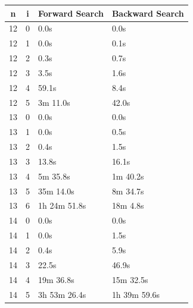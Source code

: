\documentclass[10pt,journal,compsoc]{IEEEtran}
\begin{document}
\begin{table}[htbp]
  \begin{tabular}{c|c|l|l}
    \textbf{n} & \textbf{i} & \textbf{Forward Search } & \textbf{Backward Search } \\ \hline
    12         & 0          & 0.0s                     & 0.0s                      \\
    12         & 1          & 0.0s                     & 0.1s                      \\
    12         & 2          & 0.3s                     & 0.7s                      \\
    12         & 3          & 3.5s                     & 1.6s                      \\
    12         & 4          & 59.1s                    & 8.4s                      \\
    12         & 5          & 3m 11.0s                 & 42.0s                     \\
    \hline
    13         & 0          & 0.0s                     & 0.0s                      \\
    13         & 1          & 0.0s                     & 0.5s                      \\
    13         & 2          & 0.4s                     & 1.5s                      \\
    13         & 3          & 13.8s                    & 16.1s                     \\
    13         & 4          & 5m 35.8s                 & 1m 40.2s                  \\
    13         & 5          & 35m 14.0s                & 8m 34.7s                  \\
    13         & 6          & 1h 24m 51.8s             & 18m 4.8s                  \\
    \hline
    14         & 0          & 0.0s                     & 0.0s                      \\
    14         & 1          & 0.0s                     & 1.5s                      \\
    14         & 2          & 0.4s                     & 5.9s                      \\
    14         & 3          & 22.5s                    & 46.9s                     \\
    14         & 4          & 19m 36.8s                & 15m 32.5s                 \\
    14         & 5          & 3h 53m 26.4s             & 1h 39m 59.6s              \\

\end{tabular}
\end{table}
\end{document}
